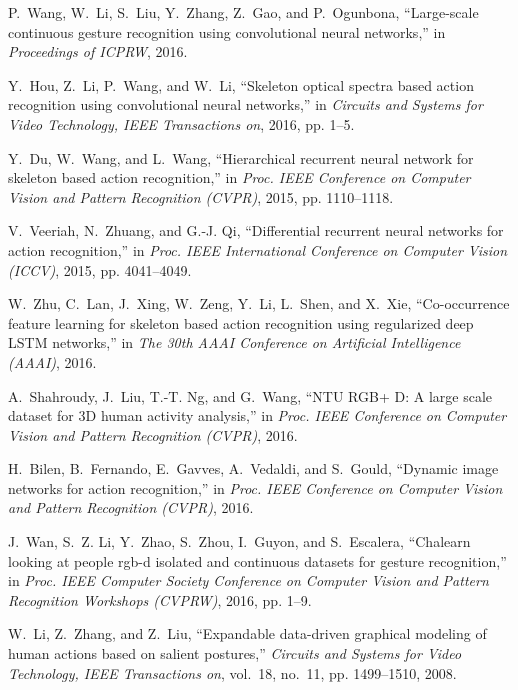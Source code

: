 \documentclass[10pt, a4paper, conference]{IEEEtran}
\begin{document}
\begin{thebibliography}{10}
P.~Wang, W.~Li, S.~Liu, Y.~Zhang, Z.~Gao, and P.~Ogunbona, ``Large-scale
  continuous gesture recognition using convolutional neural networks,'' in
  \emph{Proceedings of ICPRW}, 2016.

Y.~Hou, Z.~Li, P.~Wang, and W.~Li, ``Skeleton optical spectra based action
  recognition using convolutional neural networks,'' in \emph{Circuits and
  Systems for Video Technology, IEEE Transactions on}, 2016, pp. 1--5.

Y.~Du, W.~Wang, and L.~Wang, ``Hierarchical recurrent neural network for
  skeleton based action recognition,'' in \emph{Proc. IEEE Conference on
  Computer Vision and Pattern Recognition (CVPR)}, 2015, pp. 1110--1118.

V.~Veeriah, N.~Zhuang, and G.-J. Qi, ``Differential recurrent neural networks
  for action recognition,'' in \emph{Proc. IEEE International Conference on
  Computer Vision (ICCV)}, 2015, pp. 4041--4049.

W.~Zhu, C.~Lan, J.~Xing, W.~Zeng, Y.~Li, L.~Shen, and X.~Xie, ``Co-occurrence
  feature learning for skeleton based action recognition using regularized deep
  {LSTM} networks,'' in \emph{The 30th AAAI Conference on Artificial
  Intelligence (AAAI)}, 2016.

A.~Shahroudy, J.~Liu, T.-T. Ng, and G.~Wang, ``{NTU RGB+ D}: A large scale
  dataset for {3D} human activity analysis,'' in \emph{Proc. IEEE Conference on
  Computer Vision and Pattern Recognition (CVPR)}, 2016.

H.~Bilen, B.~Fernando, E.~Gavves, A.~Vedaldi, and S.~Gould, ``Dynamic image
  networks for action recognition,'' in \emph{Proc. IEEE Conference on Computer
  Vision and Pattern Recognition (CVPR)}, 2016.

J.~Wan, S.~Z. Li, Y.~Zhao, S.~Zhou, I.~Guyon, and S.~Escalera, ``Chalearn
  looking at people rgb-d isolated and continuous datasets for gesture
  recognition,'' in \emph{Proc. IEEE Computer Society Conference on Computer
  Vision and Pattern Recognition Workshops (CVPRW)}, 2016, pp. 1--9.

W.~Li, Z.~Zhang, and Z.~Liu, ``Expandable data-driven graphical modeling of
  human actions based on salient postures,'' \emph{Circuits and Systems for
  Video Technology, IEEE Transactions on}, vol.~18, no.~11, pp. 1499--1510,
  2008.


\end{thebibliography}
\end{document}
